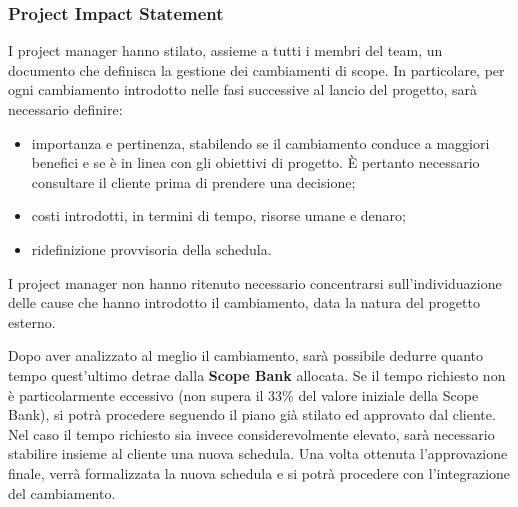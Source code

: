 \subsubsection{Project Impact Statement}
I project manager hanno stilato, assieme a tutti i membri del team, un documento che definisca la gestione dei cambiamenti di scope. In particolare, per ogni cambiamento introdotto nelle fasi successive al lancio del progetto, sarà necessario definire:
\begin{itemize}
    \item importanza e pertinenza, stabilendo se il cambiamento conduce a maggiori benefici e se è in linea con gli obiettivi di progetto. È pertanto necessario consultare il cliente prima di prendere una decisione;
    \item costi introdotti, in termini di tempo, risorse umane e denaro;
    \item ridefinizione provvisoria della schedula.
\end{itemize}
I project manager non hanno ritenuto necessario concentrarsi sull'individuazione delle cause che hanno introdotto il cambiamento, data la natura del progetto esterno.

Dopo aver analizzato al meglio il cambiamento, sarà possibile dedurre quanto tempo quest'ultimo detrae dalla \textbf{Scope Bank} allocata. Se il tempo richiesto non è particolarmente eccessivo (non supera il 33\% del valore iniziale della Scope Bank), si potrà procedere seguendo il piano già stilato ed approvato dal cliente.
Nel caso il tempo richiesto sia invece considerevolmente elevato, sarà necessario stabilire insieme al cliente una nuova schedula. Una volta ottenuta l'approvazione finale, verrà formalizzata la nuova schedula e si potrà procedere con l'integrazione del cambiamento.